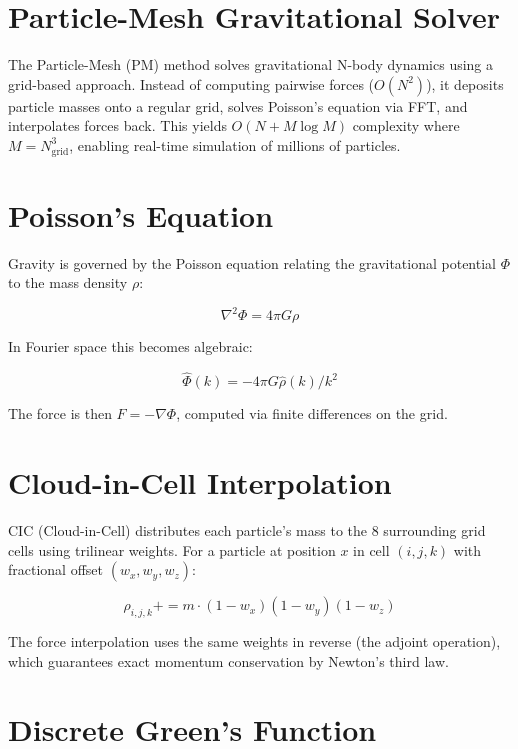 \section{Particle-Mesh Gravitational Solver}

The Particle-Mesh (PM) method solves gravitational N-body dynamics
using a grid-based approach. Instead of computing pairwise forces
($O(N^2)$), it deposits particle masses onto a regular grid, solves
Poisson's equation via FFT, and interpolates forces back. This yields
$O(N + M \log M)$ complexity where $M = N_{\text{grid}}^3$, enabling
real-time simulation of millions of particles.

\section{Poisson's Equation}

Gravity is governed by the Poisson equation relating the gravitational
potential $\Phi$ to the mass density $\rho$:

\begin{equation}
\nabla^2 \Phi = 4\pi G \rho
\end{equation}

In Fourier space this becomes algebraic:

\begin{equation}
\hat{\Phi}(k) = -4\pi G \hat{\rho}(k) / k^2
\end{equation}

The force is then $F = -\nabla \Phi$, computed via finite differences
on the grid.

\section{Cloud-in-Cell Interpolation}

CIC (Cloud-in-Cell) distributes each particle's mass to the 8
surrounding grid cells using trilinear weights. For a particle at
position $x$ in cell $(i,j,k)$ with fractional offset $(w_x, w_y, w_z)$:

\begin{equation}
\rho_{i,j,k} += m \cdot (1 - w_x)(1 - w_y)(1 - w_z)
\end{equation}

The force interpolation uses the same weights in reverse (the adjoint
operation), which guarantees exact momentum conservation by Newton's
third law.

\section{Discrete Green's Function}

